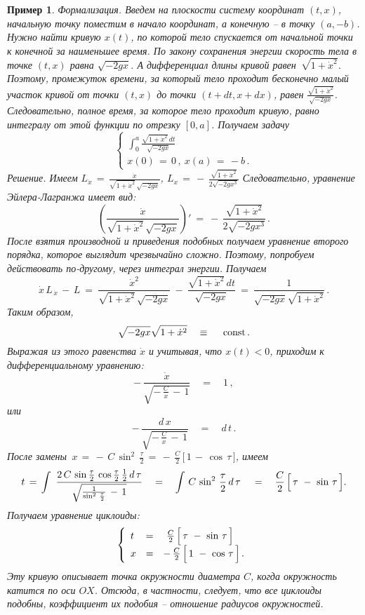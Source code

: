 \documentclass[12pt,a4paper]{article}
\newtheorem{ex}{Пример}
\begin{document}
\begin{ex}
Формализация. {\em Введем на плоскости систему координат $(t,x)$, начальную точку
поместим в начало координат, а конечную -- в точку $(a, -b)$.
Нужно найти кривую $x(t)$, по которой тело спускается от начальной
точки к конечной за наименьшее время. По закону сохранения энергии
скорость тела в  точке $(t, x)$ равна $\sqrt{-2gx}$.
А дифференциал длины кривой равен~$\sqrt{1+\dot x^2}$. Поэтому, промежуток времени, 
за который тело проходит бесконечно малый участок кривой от точки 
$(t, x)$ до точки $(t + dt, x + dx)$, равен $\frac{\sqrt{1+\dot x^2}}{\sqrt{-2gx}}$. 
Следовательно, полное время, за которое тело проходит кривую, равно интегралу от этой функции 
по отрезку $[0, a]$. Получаем задачу 
\begin{equation}\label{eq.brach}
\left\{
\begin{array}{l}
\int_0^a \frac{\sqrt{1+\dot x^2}\, dt}{\sqrt{-2gx}}\\
x(0)\, = \, 0\, , \ x(a)\, = \, -b\, . 
\end{array}
\right.
\end{equation}  
{\em Решение.}   Имеем $L_{\dot x}\, = \, \frac{\dot x}{\sqrt{1+\dot x^2}\, \sqrt{-2gx}}$, 
 $L_{x}\, = \, -\, \frac{\sqrt{1+\dot x^2}}{2\sqrt{-2gx^3}}$
Следовательно, уравнение Эйлера-Лагранжа имеет вид: 
$$
\left( \frac{\dot x}{\sqrt{1+\dot x^2}\, \sqrt{-2gx}}\right)'\ = \ -\, \frac{\sqrt{1+\dot x^2}}{2\sqrt{-2gx^3}}
\, .
$$
После взятия производной и приведения подобных получаем уравнение второго порядка, которое 
выглядит чрезвычайно сложно. Поэтому, попробуем действовать по-другому, через интеграл энергии.  
Получаем
$$
\dot x \, L_{\, \dot x}\, - \, L\ = \ \frac{\dot x^2}{\sqrt{1+\dot x^2}\, \sqrt{-2gx}} \ - \ 
\frac{\sqrt{1+\dot x^2}\, dt}{\sqrt{-2gx}} \ = \ \frac{1}{{\sqrt{-2gx}} \sqrt{1+\dot x^2}}\, . 
$$
Таким образом, 
$$
{\sqrt{-2gx}} \sqrt{1+\dot x^2} \quad \equiv \ \quad {\rm const}\, .
$$
Выражая из этого равенства $\dot x$ и учитывая, что $x(t)<0$, приходим к дифференциальному уравнению:
$$
-\, \frac{\dot x}{\sqrt{-\, \frac{C}{x}\, - \, 1}}\quad = \quad
1\, ,
$$
или
$$
-\, \frac{d\,  x}{\sqrt{-\, \frac{C}{x}\, - \, 1}}\quad = \quad
d\, t\, .
$$
После замены $\, x\, = \, -\, C\, \sin^2\, \frac{\tau}{2}\, = \,
-\, \frac{C}{2}\, \bigl[ \, 1 \, - \, \cos \, \tau\, \bigr]$,
имеем
$$
t\, = \, \int \ \frac{2\, C\, \sin \frac{\tau}{2}\, \cos
\frac{\tau}{2}\, \frac12\, d\, \tau}{\sqrt{\frac{1}{\sin^2\,
\frac{\tau}{2}}\, - \, 1}}\quad = \quad \int\, C\, \sin^2\, \frac{\tau}{2}\,
d\, \tau\, \quad = \quad \frac{C}{2}\, \Bigl[ \, \tau \ - \
\sin\,  \tau  \, \Bigr].
$$
Получаем уравнение} циклоиды:
$$
\left\{
\begin{array}{lcl}
t & = & \ \frac{C}{2}\, \Bigl[ \, \tau \ - \  \sin\, \tau  \, \Bigr]\\
x & = & -\, \frac{C}{2}\,  \Bigl[\, 1\ - \ \cos\, \tau  \,
\Bigr]\, .
\end{array}
\right.
$$
{\em Эту кривую описывает точка
 окружности диаметра  $C$, когда окружность катится по оси
$OX$.
Отсюда, в частности, следует, что все циклоиды подобны,
коэффициент их подобия -- отношение радиусов окружностей.}
\end{ex}
\end{document}

